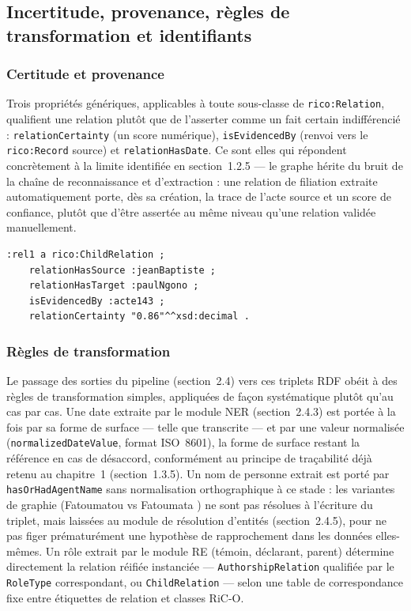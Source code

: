 \subsection{Incertitude, provenance, règles de transformation et identifiants}

\subsubsection*{Certitude et provenance}

Trois propriétés génériques, applicables à toute sous-classe de \texttt{rico:Relation}, qualifient une relation plutôt que de l'asserter comme un fait certain indifférencié : \texttt{relationCertainty} (un score numérique), \texttt{isEvidencedBy} (renvoi vers le \texttt{rico:Record} source) et \texttt{relationHasDate}.
Ce sont elles qui répondent concrètement à la limite identifiée en section~1.2.5 --- le graphe hérite du bruit de la chaîne de reconnaissance et d'extraction : une relation de filiation extraite automatiquement porte, dès sa création, la trace de l'acte source et un score de confiance, plutôt que d'être assertée au même niveau qu'une relation validée manuellement.

\begin{lstlisting}[basicstyle=\ttfamily\small, breaklines=true]
:rel1 a rico:ChildRelation ;
    relationHasSource :jeanBaptiste ;
    relationHasTarget :paulNgono ;
    isEvidencedBy :acte143 ;
    relationCertainty "0.86"^^xsd:decimal .
\end{lstlisting}

\subsubsection*{Règles de transformation}

Le passage des sorties du pipeline (section~2.4) vers ces triplets RDF obéit à des règles de transformation simples, appliquées de façon systématique plutôt qu'au cas par cas.
Une date extraite par le module NER (section~2.4.3) est portée à la fois par sa forme de surface --- telle que transcrite --- et par une valeur normalisée (\texttt{normalizedDateValue}, format ISO~8601), la forme de surface restant la référence en cas de désaccord, conformément au principe de traçabilité déjà retenu au chapitre~1 (section~1.3.5).
Un nom de personne extrait est porté par \texttt{hasOrHadAgentName} sans normalisation orthographique à ce stade : les variantes de graphie (\og Fatoumatou \fg{} vs \og Fatoumata \fg{}) ne sont pas résolues à l'écriture du triplet, mais laissées au module de résolution d'entités (section~2.4.5), pour ne pas figer prématurément une hypothèse de rapprochement dans les données elles-mêmes.
Un rôle extrait par le module RE (témoin, déclarant, parent) détermine directement la relation réifiée instanciée --- \texttt{AuthorshipRelation} qualifiée par le \texttt{RoleType} correspondant, ou \texttt{ChildRelation} --- selon une table de correspondance fixe entre étiquettes de relation et classes RiC-O.

